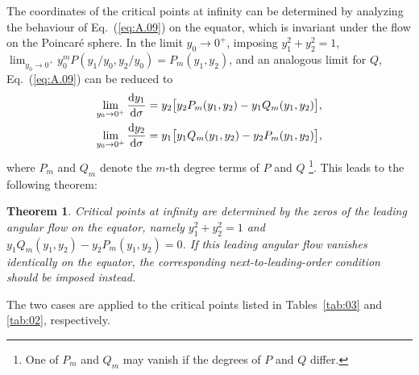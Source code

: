 \documentclass[aps,prd,twocolumn]{revtex4-2}
\newtheorem{theorem}{Theorem}
\newcommand\dx{{\rm d}}
\begin{document}
The coordinates of the critical points at infinity can be determined by analyzing the behaviour of Eq.~(\ref{eq:A.09}) on the equator, which is invariant under the flow on the Poincar\'e sphere. In the limit $y_0\rightarrow0^{+}$, imposing $y_1^2+y_2^2=1$, $\lim_{y_0\rightarrow0^{+}}y_0^m P(y_1/y_0,y_2/y_0) = P_m(y_1,y_2)$, and an analogous limit for $Q$, Eq.~(\ref{eq:A.09}) can be reduced to
\begin{equation}
\begin{aligned}
  \lim_{y_0\rightarrow0^{+}}\frac{\dx y_1}{\dx\sigma} &= y_2\big[y_2P_m(y_1,y_2) - y_1Q_m(y_1,y_2)\big], \\
  \lim_{y_0\rightarrow0^{+}}\frac{\dx y_2}{\dx\sigma} &= y_1\big[y_1Q_m(y_1,y_2) - y_2P_m(y_1,y_2)\big],
\end{aligned}
\end{equation}
where $P_m$ and $Q_m$ denote the $m$-th degree terms of $P$ and $Q$ \footnote{One of $P_m$ and $Q_m$ may vanish if the degrees of $P$ and $Q$ differ.}. 
This leads to the following theorem:
\begin{theorem}
  Critical points at infinity are determined by the zeros of the leading angular flow on the equator, namely $y_1^2+y_2^2=1$ and $y_1Q_m(y_1,y_2) - y_2P_m(y_1,y_2) = 0$. If this leading angular flow vanishes identically on the equator, the corresponding next-to-leading-order condition should be imposed instead.
\end{theorem}
The two cases are applied to the critical points listed in Tables~\ref{tab:03} and \ref{tab:02}, respectively.
\end{document}
